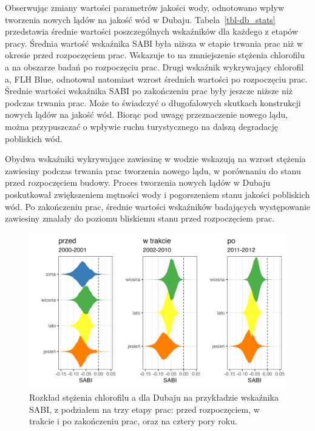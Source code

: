\documentclass{amuthesis}
\begin{document}
Obserwując zmiany wartości parametrów jakości wody, odnotowano wpływ
tworzenia nowych lądów na jakość wód w Dubaju. Tabela~\ref{tbl-db_stats}
przedstawia średnie wartości poszczególnych wskaźników dla każdego z
etapów pracy. Średnia wartość wskaźnika SABI była niższa w etapie
trwania prac niż w okresie przed rozpoczęciem prac. Wskazuje to na
zmniejszenie stężenia chlorofilu a na obszarze badań po rozpoczęciu
prac. Drugi wskaźnik wykrywający chlorofil a, FLH Blue, odnotował
natomiast wzrost średnich wartości po rozpoczęciu prac. Średnie wartości
wskaźnika SABI po zakończeniu prac były jeszcze niższe niż podczas
trwania prac. Może to świadczyć o długofalowych skutkach konstrukcji
nowych lądów na jakość wód. Biorąc pod uwagę przeznaczenie nowego lądu,
można przypuszczać o wpływie ruchu turystycznego na dalszą degradację
pobliskich wód.

Obydwa wskaźniki wykrywające zawiesinę w wodzie wskazują na wzrost
stężenia zawiesiny podczas trwania prac tworzenia nowego lądu, w
porównaniu do stanu przed rozpoczęciem budowy. Proces tworzenia nowych
lądów w Dubaju poskutkował zwiększeniem mętności wody i pogorszeniem
stanu jakości pobliskich wód. Po zakończeniu prac, średnie wartości
wskaźników badających występowanie zawiesiny zmalały do poziomu
bliskiemu stanu przed rozpoczęciem prac.

\begin{figure}[t]

{\centering \includegraphics[width=6.25in,height=\textheight]{figures/dubai/sabi_violin.png}

}

\caption{\label{fig-db_sabi_violin}Rozkład stężenia chlorofilu a dla
Dubaju na przykładzie wskaźnika SABI, z podziałem na trzy etapy prac:
przed rozpoczęciem, w trakcie i po zakończeniu prac, oraz na cztery pory
roku.}

\end{figure}
\end{document}
